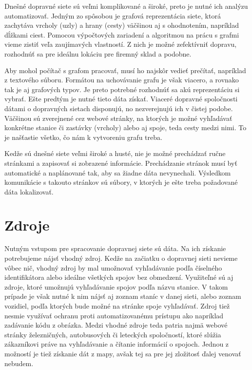 \documentclass[12pt,twoside,slovak,a4paper]{article}
\begin{document}
	Dnešné dopravné siete sú veľmi komplikované a široké, preto je nutné ich analýzu automatizovať.  Jedným zo spôsobou je grafová reprezentácia siete, ktorá zachytáva vrcholy (uzly) a hrany (cesty) väčšinou aj s ohodnotením, napríklad dĺžkami ciest.  Pomocou výpočtových zariadení a algoritmou na prácu s grafmi vieme zistiť veľa zaujímavých vlastností. Z nich je možné  zefektívniť dopravu, rozhodnúť sa pre ideálnu lokáciu pre firemný sklad a podobne. 
	
	Aby mohol počítač s grafom pracovať, musí ho najskôr vedieť prečítať, napríklad z textového súboru. Formátou na uchovávanie grafu je však viacero, a rovnako tak je aj grafových typov.  Je preto potrebné rozhodnúť sa akú reprezentáciu si vybrať. Ešte predtým je nutné tieto dáta získať. Viaceré dopravné spoločnosti dátami o dopravných sietach disponujú, no nezverejnujú ich v čistej podobe. Väčšinou sú zverejnené cez webové stránky, na ktorých je možné vyhľadávať konkrétne stanice či zastávky (vrcholy) alebo aj spoje, teda cesty medzi nimi. To je našťastie všetko, čo nám k vytvoreniu grafu treba. 
	
	Kedže sú dnešné siete veľmi široké a husté, nie je možné prechádzať ručne stránkami a zapisovať si zobrazené informácie. Prechádzanie stránok musí byť automatické a naplánované tak, aby sa žiadne dáta nevynechali. Výsledkom komunikácie s takouto stránkov sú súbory, v ktorých je ešte treba požadované dáta lokalizovať.

\section{Zdroje}
Nutným vstupom pre spracovanie dopravnej siete sú dáta. Na ich získanie potrebujeme nájsť vhodný zdroj. Kedže na začiatku o dopravnej sieti nevieme vôbec nič, vhodný zdroj by mal umožnovať vyhľadávanie podľa číselného identifikátora alebo ideálne všetkých spojov bez obmedzení. Využiteľné sú aj zdroje, ktoré umožnujú vyhľadávanie spojov podľa názvu stanice. V takom prípade je však nutné k nim nájsť aj zoznam staníc v danej sieti, alebo zoznam vozidiel, podľa ktorých bude možné na stránke spoje vyhľadávať. Zdroj tiež nesmie využívať ochranu proti automatizovanému prístupu ako napríklad zadávanie kódu z obrázka.  Medzi vhodné zdroje teda patria najmä webové stránky železničných, autobusových či leteckých spoločností, ktoré slúžia zákazníkovi práve na vyhľadávanie a čítanie informácií o spojoch. Jednou z možností je tiež získanie dát z mapy, avšak tej sa pre jej zložitosť ďalej venovať nebudem.
\end{document}
